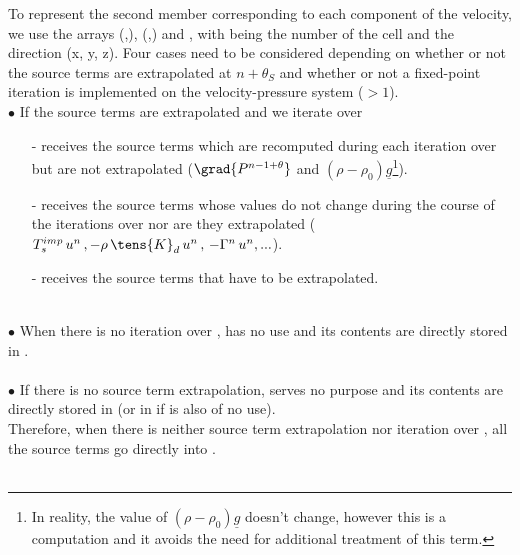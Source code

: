 To represent the second member corresponding to each component of the velocity, we use the arrays (,), (,) and , with  being the number of the cell and  the direction (x, y, z). Four cases need to be considered depending on whether or not the source terms are extrapolated at $n+\theta_S$ and whether or not a fixed-point iteration is implemented on the velocity-pressure system ($>1$).
\\
$\bullet$ If the source terms are extrapolated and we iterate over \\
\begin{itemize}
\item [-] receives the source terms which are recomputed during each iteration over  but are not extrapolated
($\grad{P^{n-1+\theta}}$ and $(\rho -\rho_0) \underline {g}$\footnote{In reality, the value of
$(\rho -\rho_0) \underline {g}$ doesn't change, however this is a computation and it avoids the need for additional treatment of this term.}).\\
\item [-] receives the source terms whose values do not change during the course of the iterations over  nor are they extrapolated
($T_s^{imp}\,u^n\,,-\rho\,\tens{K}_{d}\,u^n\,,\,-\Gamma^n\,u^n,...$).\\
\item [-] receives the source terms that have to be extrapolated.\\
\\
\end{itemize}
$\bullet$ When there is no iteration over ,  has no use and its contents are directly stored in .\\
\\
$\bullet$ If there is no source term extrapolation,  serves no purpose and its contents are directly stored in  (or in  if  is also of no use).\\
Therefore, when there is neither source term extrapolation nor iteration over , all the source terms go directly into .\\
\\
